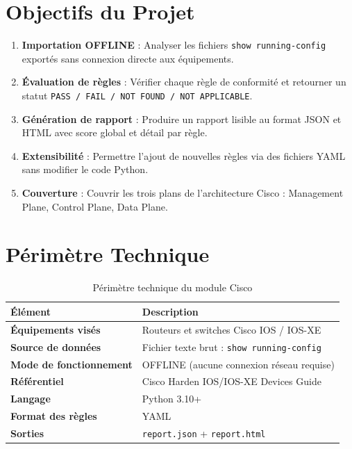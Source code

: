 \documentclass[12pt, a4paper]{report}
\begin{document}
\section{Objectifs du Projet}

\begin{enumerate}[leftmargin=1.5cm, label=\textbf{OBJ-\arabic*.}]
  \item \textbf{Importation OFFLINE} : Analyser les fichiers \texttt{show running-config} exportés sans connexion directe aux équipements.
  \item \textbf{Évaluation de règles} : Vérifier chaque règle de conformité et retourner un statut \texttt{PASS / FAIL / NOT FOUND / NOT APPLICABLE}.
  \item \textbf{Génération de rapport} : Produire un rapport lisible au format JSON et HTML avec score global et détail par règle.
  \item \textbf{Extensibilité} : Permettre l'ajout de nouvelles règles via des fichiers YAML sans modifier le code Python.
  \item \textbf{Couverture} : Couvrir les trois plans de l'architecture Cisco : Management Plane, Control Plane, Data Plane.
\end{enumerate}

\section{Périmètre Technique}

\begin{table}[H]
  \centering
  \caption{Périmètre technique du module Cisco}
  \begin{tabularx}{\textwidth}{>{\bfseries\color{ciscoDark}}l X}
    \toprule
    \rowcolor{tableHeader}\color{white}\textbf{Élément} & \color{white}\textbf{Description} \\
    \midrule
    \rowcolor{tableRowA} Équipements visés & Routeurs et switches Cisco IOS / IOS-XE \\
    \rowcolor{tableRowB} Source de données & Fichier texte brut : \texttt{show running-config} \\
    \rowcolor{tableRowA} Mode de fonctionnement & OFFLINE (aucune connexion réseau requise) \\
    \rowcolor{tableRowB} Référentiel & Cisco Harden IOS/IOS-XE Devices Guide \\
    \rowcolor{tableRowA} Langage & Python 3.10+ \\
    \rowcolor{tableRowB} Format des règles & YAML \\
    \rowcolor{tableRowA} Sorties & \texttt{report.json} + \texttt{report.html} \\
    \bottomrule
  \end{tabularx}
\end{table}
\end{document}
